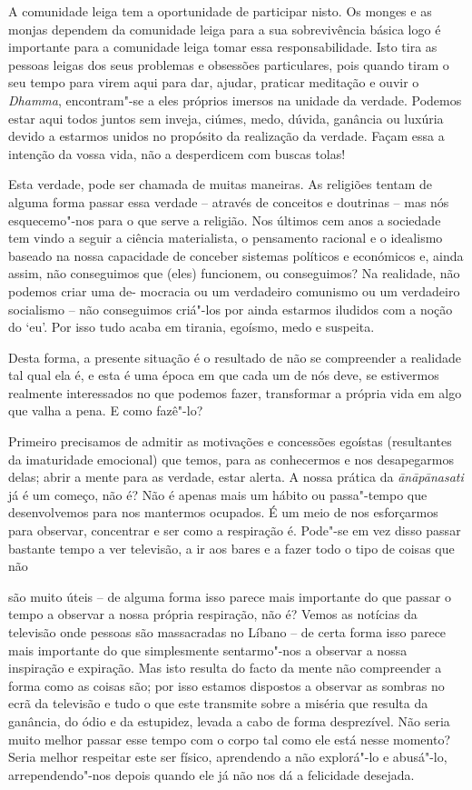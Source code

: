 A comunidade leiga tem a oportunidade de participar nisto. Os monges e
as monjas dependem da comunidade leiga para a sua sobrevivência básica
logo é importante para a comunidade leiga tomar essa responsabilidade.
Isto tira as pessoas leigas dos seus problemas e obsessões particulares,
pois quando tiram o seu tempo para virem aqui para dar, ajudar, praticar
meditação e ouvir o \emph{Dhamma}, encontram"-se a eles próprios imersos
na unidade da verdade. Podemos estar aqui todos juntos sem inveja,
ciúmes, medo, dúvida, ganância ou luxúria devido a estarmos unidos no
propósito da realização da verdade. Façam essa a intenção da vossa vida,
não a desperdicem com buscas tolas!

Esta verdade, pode ser chamada de muitas maneiras. As religiões tentam
de alguma forma passar essa verdade -- através de conceitos e doutrinas
-- mas nós esquecemo"-nos para o que serve a religião. Nos últimos cem
anos a sociedade tem vindo a seguir a ciência materialista, o pensamento
racional e o idealismo baseado na nossa capacidade de conceber sistemas
políticos e económicos e, ainda assim, não conseguimos que (eles)
funcionem, ou conseguimos? Na realidade, não podemos criar uma de-
mocracia ou um verdadeiro comunismo ou um verdadeiro socialismo -- não
conseguimos criá"-los por ainda estarmos iludidos com a noção do `eu'.
Por isso tudo acaba em tirania, egoísmo, medo e suspeita.

Desta forma, a presente situação é o resultado de não se compreender a
realidade tal qual ela é, e esta é uma época em que cada um de nós deve,
se estivermos realmente interessados no que podemos fazer, transformar a
própria vida em algo que valha a pena. E como fazê"-lo?

Primeiro precisamos de admitir as motivações e concessões egoístas
(resultantes da imaturidade emocional) que temos, para as conhecermos e
nos desapegarmos delas; abrir a mente para as verdade, estar alerta. A
nossa prática da \emph{ānāpānasati} já é um começo, não é? Não é apenas
mais um hábito ou passa"-tempo que desenvolvemos para nos mantermos
ocupados. É um meio de nos esforçarmos para observar, concentrar e ser
como a respiração é. Pode"-se em vez disso passar bastante tempo a ver
televisão, a ir aos bares e a fazer todo o tipo de coisas que não

são muito úteis -- de alguma forma isso parece mais importante do que
passar o tempo a observar a nossa própria respiração, não é? Vemos as
notícias da televisão onde pessoas são massacradas no Líbano -- de certa
forma isso parece mais importante do que simplesmente sentarmo"-nos a
observar a nossa inspiração e expiração. Mas isto resulta do facto da
mente não compreender a forma como as coisas são; por isso estamos
dispostos a observar as sombras no ecrã da televisão e tudo o que este
transmite sobre a miséria que resulta da ganância, do ódio e da
estupidez, levada a cabo de forma desprezível. Não seria muito melhor
passar esse tempo com o corpo tal como ele está nesse momento? Seria
melhor respeitar este ser físico, aprendendo a não explorá"-lo e
abusá"-lo, arrependendo"-nos depois quando ele já não nos dá a felicidade
desejada.

